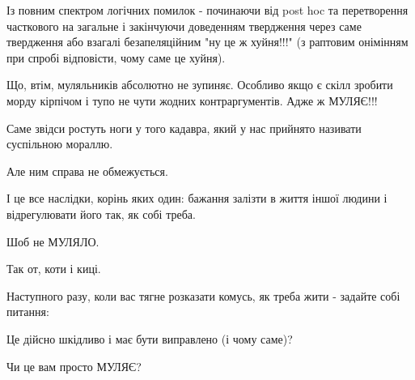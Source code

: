 Із повним спектром логічних помилок - починаючи від post hoc та перетворення
часткового на загальне і закінчуючи доведенням твердження через саме твердження
або взагалі безапеляційним "ну це ж хуйня!!!" (з раптовим онімінням при спробі
відповісти, чому саме це хуйня).

Що, втім, муляльників абсолютно не зупиняє. Особливо якщо є скілл зробити морду
кірпічом і тупо не чути жодних контраргументів. Адже ж МУЛЯЄ!!!

Саме звідси ростуть ноги у того кадавра, який у нас прийнято називати
суспільною мораллю.

Але ним справа не обмежується.

І це все наслідки, корінь яких один: бажання залізти в життя іншої людини і
відрегулювати його так, як собі треба.

Шоб не МУЛЯЛО.

Так от, коти і киці.

Наступного разу, коли вас тягне розказати комусь, як треба жити - задайте собі
питання:

Це дійсно шкідливо і має бути виправлено (і чому саме)?

Чи це вам просто МУЛЯЄ?
